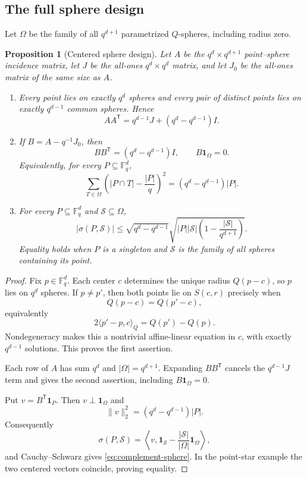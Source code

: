 \documentclass[11pt,letterpaper]{amsart}
\newtheorem{proposition}[proposition]{Proposition}
\theoremstyle{definition}
\theoremstyle{remark}
\newcommand{\1}{\mathbf 1}
\newcommand{\ip}[2]{\langle #1,#2\rangle_Q}
\begin{document}
\subsection{The full sphere design}

Let $\Omega$ be the family of all $q^{d+1}$ parametrized $Q$-spheres, including radius zero.

\begin{proposition}[Centered sphere design]\label{prop:sphere-design}
Let $A$ be the $q^d\times q^{d+1}$ point--sphere incidence matrix, let $J$ be the all-ones $q^d\times q^d$ matrix, and let $J_0$ be the all-ones matrix of the same size as $A$.
\begin{enumerate}[label=\textup{(\arabic*)}]
\item Every point lies on exactly $q^d$ spheres and every pair of distinct points lies on exactly $q^{d-1}$ common spheres.  Hence
\[
 AA^{\mathsf T}=q^{d-1}J+(q^d-q^{d-1})I.
\]
\item If $B=A-q^{-1}J_0$, then
\[
 BB^{\mathsf T}=(q^d-q^{d-1})I,
 \qquad B\1_{\Omega}=0.
\]
Equivalently, for every $P\subseteq\mathbb F_q^d$,
\[
 \sum_{T\in\Omega}
 \left(|P\cap T|-\frac{|P|}{q}\right)^2
 =(q^d-q^{d-1})|P|.
\]
\item For every $P\subseteq\mathbb F_q^d$ and $\mathcal S\subseteq\Omega$,
\begin{equation}\label{eq:complement-sphere}
 |\sigma(P,\mathcal S)|
 \le \sqrt{q^d-q^{d-1}}
 \sqrt{|P||\mathcal S|
 \left(1-\frac{|\mathcal S|}{q^{d+1}}\right)}.
\end{equation}
Equality holds when $P$ is a singleton and $\mathcal S$ is the family of all spheres containing its point.
\end{enumerate}
\end{proposition}

\begin{proof}
Fix $p\in\mathbb F_q^d$.  Each center $c$ determines the unique radius $Q(p-c)$, so $p$ lies on $q^d$ spheres.  If $p\ne p'$, then both points lie on $S(c,r)$ precisely when
\[
 Q(p-c)=Q(p'-c),
\]
equivalently
\[
 2\ip{p'-p}{c}=Q(p')-Q(p).
\]
Nondegeneracy makes this a nontrivial affine-linear equation in $c$, with exactly $q^{d-1}$ solutions.  This proves the first assertion.

Each row of $A$ has sum $q^d$ and $|\Omega|=q^{d+1}$.  Expanding $BB^{\mathsf T}$ cancels the $q^{d-1}J$ term and gives the second assertion, including $B\1_\Omega=0$.

Put $v=B^{\mathsf T}\1_P$.  Then $v\perp\1_\Omega$ and
\[
 \|v\|_2^2=(q^d-q^{d-1})|P|.
\]
Consequently
\[
 \sigma(P,\mathcal S)
 =\left\langle v,\1_{\mathcal S}
 -\frac{|\mathcal S|}{|\Omega|}\1_\Omega\right\rangle,
\]
and Cauchy--Schwarz gives \eqref{eq:complement-sphere}.  In the point-star example the two centered vectors coincide, proving equality.
\end{proof}
\end{document}
